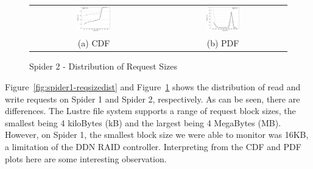 \begin{figure}[!t]
\begin{center}
\begin{tabular}{cc}
\hspace*{-1cm}                                                           
{\includegraphics[width=0.27\textwidth]{./figs/spider2-reqSizeCDF.eps}}&
\hspace{-2mm}
{\includegraphics[width=0.27\textwidth]{./figs/spider2-reqSizePDF.eps}}\\
\small (a) CDF & \small(b) PDF \\
\end{tabular}
\vspace{-0.1in}
\caption{Spider 2 - Distribution of Request Sizes}
\label{fig:spider2-reqsizedist}
\end{center}
\end{figure}

Figure~\ref{fig:spider1-reqsizedist} and Figure~\ref{fig:spider2-reqsizedist}
shows the distribution of read and write requests on Spider 1 and Spider 2,
respectively. As can be seen, there are differences. The Lustre file system
supports a range of request block sizes, the smallest being 4 kiloBytes (kB)
and the largest being 4 MegaBytes (MB).  However, on Spider 1, the smallest
block size we were able to monitor was 16KB, a limitation of the DDN RAID
controller. Interpreting from the CDF and PDF plots here are some interesting
observation.

